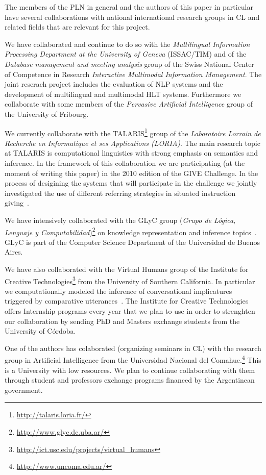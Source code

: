 The members of the PLN in general and the authors of this paper in particular
have several collaborations with national international research groups in CL
and related fields that are relevant for this project. 
 
We have collaborated and continue to do so with the \textit{Multilingual
Information
Processing Department at the University of Geneva} (ISSAC/TIM) and of the
\emph{Database management
and meeting
analysis} group of the Swiss National Center of Competence in Research  
\emph{Interactive Multimodal Information Management}. The joint reserach
project includes the evaluation of NLP systems and the
development of multilingual and multimodal HLT systems. Furthermore we
collaborate with some members of the \textit{Pervasive Artificial
Intelligence} group of the University of Fribourg. 

We currently collaborate with
the TALARIS\footnote{\url{http://talaris.loria.fr/}}
group of the \emph{Laboratoire Lorrain de Recherche en Informatique et ses
Applications (LORIA)}. The main research topic at TALARIS is computational
linguistics
with strong emphasis on semantics and inference. In the framework of this
collaboration we are participating
(at the moment of writing this paper) in the 2010 edition of the GIVE
Challenge. In the process of desigining the systems that will participate in
the challenge we jointly investigated the use of different referring strategies
in situated instruction
giving~\cite{amoia10}. 

We have intensively collaborated with the GLyC group (\textit{Grupo de L\'ogica,
Lenguaje y Computabilidad})\footnote{\url{http://www.glyc.dc.uba.ar/}} on
knowledge representation and inference topics~\cite{AG06,AFFM08}. GLyC is part
of the Computer Science Department of the Universidad de Buenos Aires. 

We have also collaborated with the Virtual Humans group of the Institute for
Creative Technologies\footnote{\url{http://ict.usc.edu/projects/virtual_humans}}
from the University of Southern California. In particular we computationally
modeled the inference of conversational implicatures triggered by comparative
utterances~\cite{benotti09a}. The Institute for Creative Technologies offers
Internship programs every year that we plan to use in order to strenghten our
collaboration by sending PhD and Masters exchange students from the University
of C\'ordoba.

One of the authors has colaborated (organizing seminars in CL) with the
research group in Artificial Intelligence from the Universidad Nacional del
Comahue.\footnote{\url{http://www.uncoma.edu.ar/}} This is a University with
low resources. We plan to continue collaborating with them through student and
professors exchange programs financed by the Argentinean government. 


